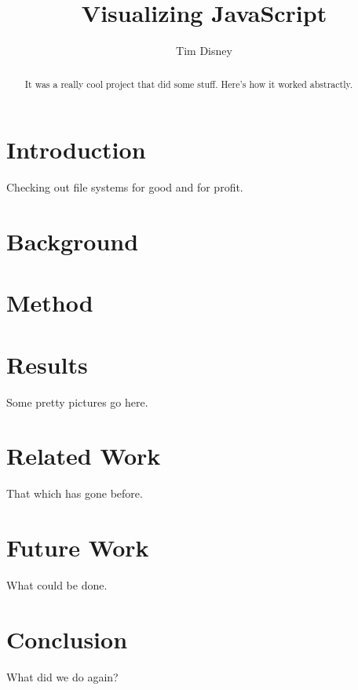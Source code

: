 \documentclass{article}
\begin{document}
\title{Visualizing JavaScript}
\author{Tim Disney}

\maketitle

\lstset{showstringspaces=false}

\begin{abstract}
It was a really cool project that did some stuff. Here's how it worked abstractly.
\end{abstract}

\section{Introduction}
Checking out file systems for good and for profit.

\section{Background}

\section{Method}

\section{Results}
Some pretty pictures go here.

\section{Related Work}
\label{sec:related}
That which has gone before.

\section{Future Work}
\label{sec:future}
What could be done.

\section{Conclusion}
\label{sec:conclusion}
What did we do again?



\end{document}
